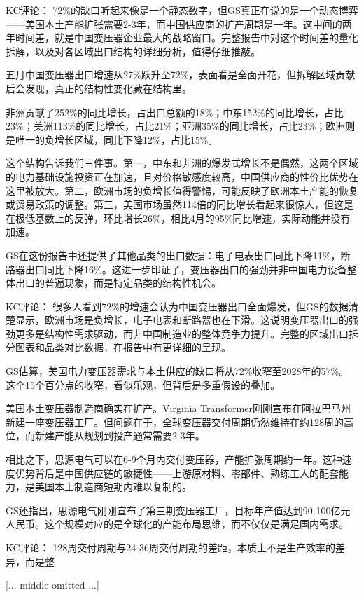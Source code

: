 \documentclass[11pt]{ctexart}
\begin{document}
KC评论： 72\%的缺口听起来像是一个静态数字，但GS真正在说的是一个动态博弈——美国本土产能扩张需要2-3年，而中国供应商的扩产周期是一年。这中间的两年时间差，就是中国变压器企业最大的战略窗口。完整报告中对这个时间差的量化拆解，以及对各区域出口结构的详细分析，值得仔细推敲。

五月中国变压器出口增速从27\%跃升至72\%，表面看是全面开花，但拆解区域贡献后会发现，真正的结构性变化藏在结构里。

非洲贡献了252\%的同比增长，占出口总额的18\%；中东152\%的同比增长，占比23\%；美洲113\%的同比增长，占比21\%；亚洲35\%的同比增长，占比23\%；欧洲则是唯一的负增长区域，同比下降12\%，占比15\%。

这个结构告诉我们三件事。第一，中东和非洲的爆发式增长不是偶然，这两个区域的电力基础设施投资正在加速，且对价格敏感度较高，中国供应商的性价比优势在这里被放大。第二，欧洲市场的负增长值得警惕，可能反映了欧洲本土产能的恢复或贸易政策的调整。第三，美国市场虽然114倍的同比增长看起来很惊人，但这是在极低基数上的反弹，环比增长26\%，相比4月的95\%同比增速，实际动能并没有加速。

GS在这份报告中还提供了其他品类的出口数据：电子电表出口同比下降11\%，断路器出口同比下降16\%。这进一步印证了，变压器出口的强劲并非中国电力设备整体出口的普遍现象，而是特定品类的结构性机会。

KC评论： 很多人看到72\%的增速会认为中国变压器出口全面爆发，但GS的数据清楚显示，欧洲市场是负增长，电子电表和断路器也在下滑。这说明变压器出口的强劲更多是结构性需求驱动，而非中国制造业的整体竞争力提升。完整的区域出口拆分图表和品类对比数据，在报告中有更详细的呈现。

GS估算，美国电力变压器需求与本土供应的缺口将从72\%收窄至2028年的57\%。这个15个百分点的收窄，看似乐观，但背后是多重假设的叠加。

美国本土变压器制造商确实在扩产。Virginia Transformer刚刚宣布在阿拉巴马州新建一座变压器工厂。但问题在于，全球变压器交付周期仍然维持在约128周的高位，而新建产能从规划到投产通常需要2-3年。

相比之下，思源电气可以在6-9个月内交付变压器，产能扩张周期约一年。这种速度优势背后是中国供应链的敏捷性——上游原材料、零部件、熟练工人的配套能力，是美国本土制造商短期内难以复制的。

GS还指出，思源电气刚刚宣布了第三期变压器工厂，目标年产值达到90-100亿元人民币。这个规模对应的是全球化的产能布局思维，而不仅仅是满足国内需求。

KC评论： 128周交付周期与24-36周交付周期的差距，本质上不是生产效率的差异，而是整

[... middle omitted ...]
\end{document}
